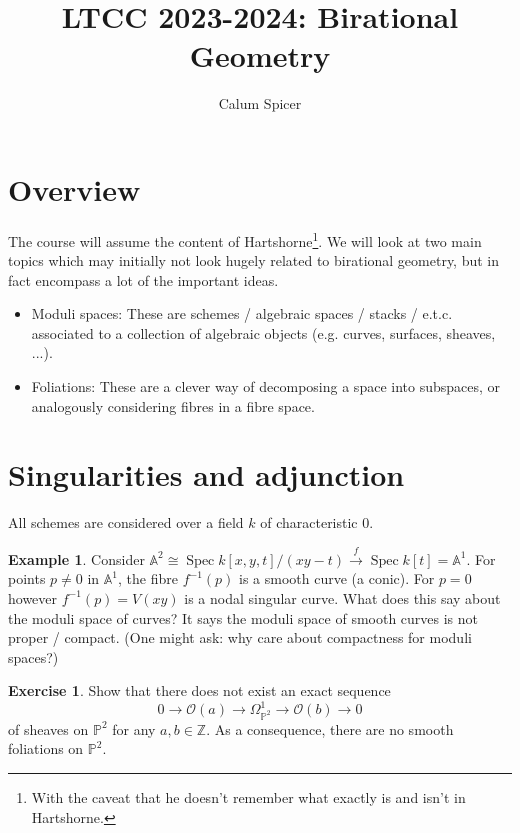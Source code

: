 \documentclass{article}
\title{LTCC 2023-2024: Birational Geometry}
\author{Calum Spicer}
\date{}
\theoremstyle{definition}
\newtheorem*{example}{Example}
\newtheorem*{exercise}{Exercise}
\DeclareMathOperator{\Spec}{Spec}
\renewcommand{\O}{\mathcal{O}}
\newcommand{\A}{\mathbb{A}}
\renewcommand{\P}{\mathbb{P}}
\newcommand{\Z}{\mathbb{Z}}
\begin{document}
\maketitle

\section*{Overview}

The course will assume the content of Hartshorne\footnote{With the caveat that
he doesn't remember what exactly is and isn't in Hartshorne.}. We will look at
two main topics which may initially not look hugely related to birational
geometry, but in fact encompass a lot of the important ideas.
\begin{itemize}
    \item Moduli spaces: These are schemes / algebraic spaces / stacks / e.t.c.
        associated to a collection of algebraic objects (e.g. curves, surfaces,
        sheaves, ...).

    \item Foliations: These are a clever way of decomposing a space into
        subspaces, or analogously considering fibres in a fibre space.
\end{itemize}

\section*{Singularities and adjunction}

All schemes are considered over a field $k$ of characteristic 0.

\begin{example}
    Consider $\A^2\cong\Spec k[x,y,t]/(xy-t)\xrightarrow{f}\Spec k[t]=\A^1$. For
    points $p\ne0$ in $\A^1$, the fibre $f^{-1}(p)$ is a smooth curve (a conic).
    For $p=0$ however  $f^{-1}(p)=V(xy)$ is a nodal singular curve. What does
    this say about the moduli space of curves? It says the moduli space of
    smooth curves is not proper / compact. (One might ask: why care about
    compactness for moduli spaces?)
\end{example}

\begin{exercise}
    Show that there does not exist an exact sequence
    \begin{equation*}
        0 \to \O(a) \to \Omega^1_{\P^2} \to \O(b) \to 0
    \end{equation*}
    of sheaves on $\P^2$ for any $a,b\in\Z$. As a consequence, there are no
    smooth foliations on $\P^2$.
\end{exercise}
\end{document}
